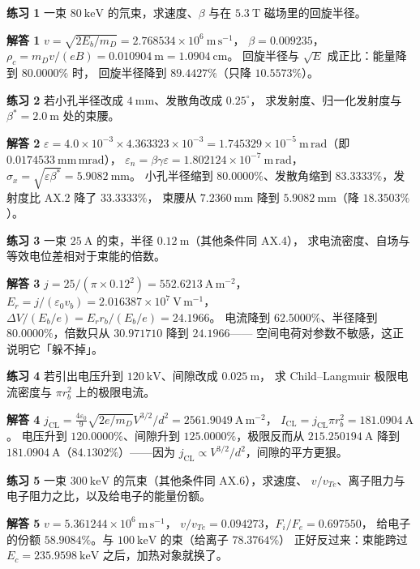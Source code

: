 \textbf{练习 1} 一束 $80\ \mathrm{keV}$ 的氘束，求速度、$\beta$ 与在 $5.3\ \mathrm{T}$
磁场里的回旋半径。

\textbf{解答 1} $v=\sqrt{2E_b/m_D}=2.768534\times10^{6}\ \mathrm{m\,s^{-1}}$，
$\beta=0.009235$，$\rho_c=m_Dv/(eB)=0.010904\ \mathrm{m}=1.0904\ \mathrm{cm}$。
回旋半径与 $\sqrt{E}$ 成正比：能量降到 $80.0000\%$ 时，
回旋半径降到 $89.4427\%$（只降 $10.5573\%$）。

\textbf{练习 2} 若小孔半径改成 $4\ \mathrm{mm}$、发散角改成 $0.25^\circ$，
求发射度、归一化发射度与 $\beta^*=2.0\ \mathrm{m}$ 处的束腰。

\textbf{解答 2} $\varepsilon=4.0\times10^{-3}\times4.363323\times10^{-3}
=1.745329\times10^{-5}\ \mathrm{m\,rad}$（即 $0.0174533\ \mathrm{mm\,mrad}$），
$\varepsilon_n=\beta\gamma\varepsilon=1.802124\times10^{-7}\ \mathrm{m\,rad}$，
$\sigma_x=\sqrt{\varepsilon\beta^*}=5.9082\ \mathrm{mm}$。
小孔半径缩到 $80.0000\%$、发散角缩到 $83.3333\%$，发射度比 AX.2 降了 $33.3333\%$，
束腰从 $7.2360\ \mathrm{mm}$ 降到 $5.9082\ \mathrm{mm}$（降 $18.3503\%$）。

\textbf{练习 3} 一束 $25\ \mathrm{A}$ 的束，半径 $0.12\ \mathrm{m}$（其他条件同 AX.4），
求电流密度、自场与等效电位差相对于束能的倍数。

\textbf{解答 3} $j=25/(\pi\times0.12^2)=552.6213\ \mathrm{A\,m^{-2}}$，
$E_r=j/(\varepsilon_0v_b)=2.016387\times10^{7}\ \mathrm{V\,m^{-1}}$，
$\Delta V/(E_b/e)=E_rr_b/(E_b/e)=24.1966$。
电流降到 $62.5000\%$、半径降到 $80.0000\%$，倍数只从 $30.971710$ 降到 $24.1966$——
空间电荷对参数不敏感，这正说明它「躲不掉」。

\textbf{练习 4} 若引出电压升到 $120\ \mathrm{kV}$、间隙改成 $0.025\ \mathrm{m}$，
求 Child--Langmuir 极限电流密度与 $\pi r_b^2$ 上的极限电流。

\textbf{解答 4} $j_\mathrm{CL}=\frac{4\varepsilon_0}{9}\sqrt{2e/m_D}V^{3/2}/d^2
=2561.9049\ \mathrm{A\,m^{-2}}$，
$I_\mathrm{CL}=j_\mathrm{CL}\pi r_b^2=181.0904\ \mathrm{A}$。
电压升到 $120.0000\%$、间隙升到 $125.0000\%$，极限反而从 $215.250194\ \mathrm{A}$ 降到
$181.0904\ \mathrm{A}$（$84.1302\%$）——因为 $j_\mathrm{CL}\propto V^{3/2}/d^2$，间隙的平方更狠。

\textbf{练习 5} 一束 $300\ \mathrm{keV}$ 的氘束（其他条件同 AX.6），求速度、
$v/v_{Te}$、离子阻力与电子阻力之比，以及给电子的能量份额。

\textbf{解答 5} $v=5.361244\times10^{6}\ \mathrm{m\,s^{-1}}$，
$v/v_{Te}=0.094273$，$F_i/F_e=0.697550$，
给电子的份额 $58.9084\%$。与 $100\ \mathrm{keV}$ 的束（给离子 $78.3764\%$）
正好反过来：束能跨过 $E_c=235.9598\ \mathrm{keV}$ 之后，加热对象就换了。

